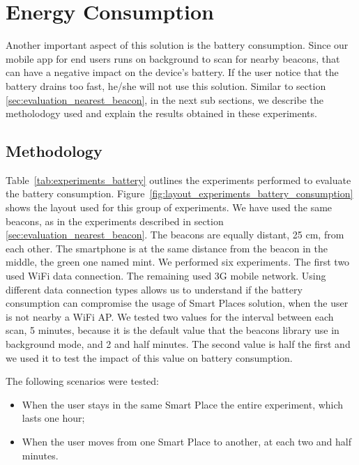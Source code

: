 \section{Energy Consumption}
\label{sec:evaluation_energy_consumption}
Another important aspect of this solution is the battery consumption.
Since our mobile app for end users runs on background to scan for nearby beacons, that can have a negative impact on the device's battery. If the user notice that the battery drains too fast, he/she will not use this solution.
Similar to section \ref{sec:evaluation_nearest_beacon}, in the next sub sections, we describe the metholodogy used and explain the results obtained in these experiments.

\subsection{Methodology}
\label{sub:evaluation_energy_consumption_methodology}
Table~\ref{tab:experiments_battery} outlines the experiments performed to evaluate the battery consumption.
Figure~\ref{fig:layout_experiments_battery_consumption} shows the layout used for this group of experiments.
We have used the same beacons, as in the experiments described in section \ref{sec:evaluation_nearest_beacon}.
The beacons are equally distant, 25 cm, from each other.
The smartphone is at the same distance from the beacon in the middle, the green one named mint.
We performed six experiments.
The first two used \gls{WiFi} data connection.
The remaining used \gls{3G} mobile network.
Using different data connection types allows us to understand if the battery consumption can compromise the usage of Smart Places solution, when the user is not nearby a \gls{WiFi} \gls{AP}.
We tested two values for the interval between each scan, 5 minutes, because it is the default value that the beacons library use in background mode, and 2 and half minutes.
The second value is half the first and we used it to test the impact of this value on battery consumption.

The following scenarios were tested:
\begin{itemize}
  \item When the user stays in the same Smart Place the entire experiment, which lasts one hour;
  \item When the user moves from one Smart Place to another, at each two and half minutes.
\end{itemize}



